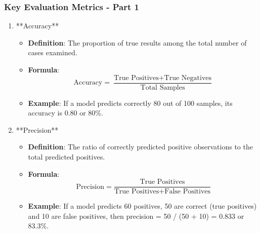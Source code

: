 \documentclass{beamer}
\begin{document}
\begin{frame}[fragile]
    \frametitle{Key Evaluation Metrics - Part 1}
    \begin{enumerate}
        \item **Accuracy**
        \begin{itemize}
            \item \textbf{Definition}: The proportion of true results among the total number of cases examined.
            \item \textbf{Formula}:
            \begin{equation}
                \text{Accuracy} = \frac{\text{True Positives} + \text{True Negatives}}{\text{Total Samples}}
            \end{equation}
            \item \textbf{Example}: If a model predicts correctly 80 out of 100 samples, its accuracy is 0.80 or 80\%.
        \end{itemize}

        \item **Precision**
        \begin{itemize}
            \item \textbf{Definition}: The ratio of correctly predicted positive observations to the total predicted positives.
            \item \textbf{Formula}:
            \begin{equation}
                \text{Precision} = \frac{\text{True Positives}}{\text{True Positives} + \text{False Positives}}
            \end{equation}
            \item \textbf{Example}: If a model predicts 60 positives, 50 are correct (true positives) and 10 are false positives, then precision = 50 / (50 + 10) = 0.833 or 83.3\%.
        \end{itemize}

    \end{enumerate}
\end{frame}
\end{document}
